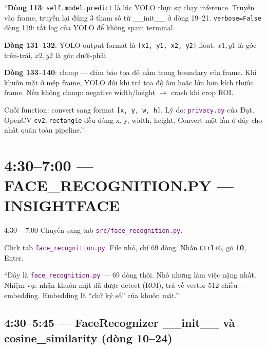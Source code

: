 \documentclass[12pt, a4paper]{article}
\newcommand{\fpath}[1]{\texttt{\textcolor{purple}{#1}}}
\begin{document}
\begin{say}
``\textbf{Dòng 113}: \texttt{self.model.predict} là lúc YOLO thực sự chạy inference.
Truyền vào frame, truyền lại đúng 3 tham số từ \_\_init\_\_ ở dòng 19--21.
\texttt{verbose=False} dòng 119: tắt log của YOLO để không spam terminal.

\textbf{Dòng 131--132}: YOLO output format là \texttt{[x1, y1, x2, y2]} float.
$x1, y1$ là góc trên-trái, $x2, y2$ là góc dưới-phải.

\textbf{Dòng 133--140}: clamp --- đảm bảo tọa độ nằm trong boundary của frame.
Khi khuôn mặt ở mép frame, YOLO đôi khi trả tọa độ âm hoặc lớn hơn kích thước frame.
Nếu không clamp: negative width/height $\to$ crash khi crop ROI.

Cuối function: convert sang format \texttt{[x, y, w, h]}.
Lý do: \fpath{privacy.py} của Đạt, OpenCV \texttt{cv2.rectangle} đều dùng x, y, width, height.
Convert một lần ở đây cho nhất quán toàn pipeline.''
\end{say}

\section{4:30--7:00 --- FACE\_RECOGNITION.PY --- INSIGHTFACE}

\begin{timing}{4:30 -- 7:00}
Chuyển sang tab \fpath{src/face\_recognition.py}.
\end{timing}

\begin{doact}
Click tab \fpath{face\_recognition.py}. File nhỏ, chỉ 69 dòng.
Nhấn \texttt{Ctrl+G}, gõ \textbf{10}, Enter.
\end{doact}

\begin{say}
``Đây là \fpath{face\_recognition.py} --- 69 dòng thôi. Nhỏ nhưng làm việc nặng nhất.
Nhiệm vụ: nhận khuôn mặt đã được detect (ROI), trả về vector 512 chiều --- embedding.
Embedding là ``chữ ký số'' của khuôn mặt.''
\end{say}

\subsection{4:30--5:45 --- FaceRecognizer \_\_init\_\_ và cosine\_similarity (dòng 10--24)}
\end{document}
